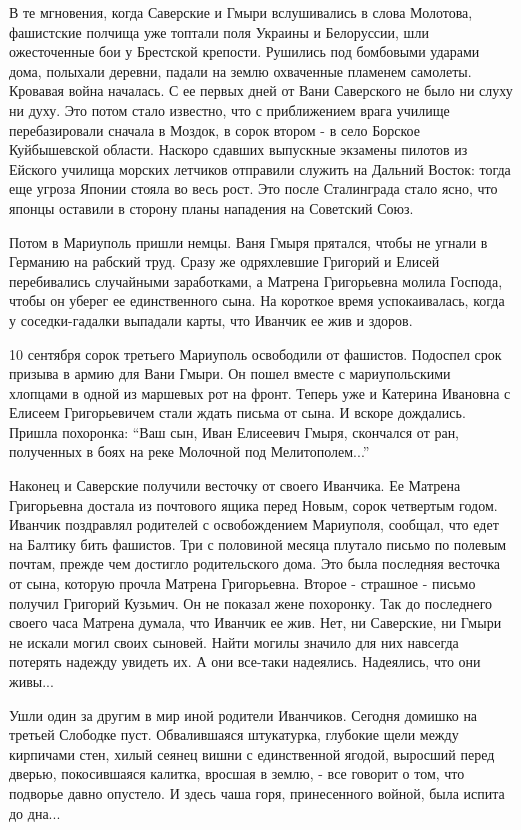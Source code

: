 В те мгновения, когда Саверские и Гмыри вслушивались в слова Молотова,
фашистские полчища уже топтали поля Украины и Белоруссии, шли ожесточенные бои
у Брестской крепости. Рушились под бомбовыми ударами дома, полыхали деревни,
падали на землю охваченные пламенем самолеты. Кровавая война началась. С ее
первых дней от Вани Саверского не было ни слуху ни духу. Это потом стало
известно, что с приближением врага училище перебазировали сначала в Моздок, в
сорок втором - в село Борское Куйбышевской области.  Наскоро сдавших выпускные
экзамены пилотов из Ейского училища морских летчиков отправили служить на
Дальний Восток: тогда еще угроза Японии стояла во весь рост. Это после
Сталинграда стало ясно, что японцы оставили в сторону планы нападения на
Советский Союз.

Потом в Мариуполь пришли немцы. Ваня Гмыря прятался, чтобы не угнали в
Германию на рабский труд. Сразу же одряхлевшие Григорий и Елисей перебивались
случайными заработка­ми, а Матрена Григорьевна молила Господа, чтобы он уберег
ее единственного сына. На короткое время успокаи­валась, когда у
соседки-гадалки выпадали карты, что Иванчик ее жив и здоров.

10 сентября сорок третьего Мариуполь освободили от фашистов. Подоспел срок
призыва в армию для Вани Гмыри. Он пошел вместе с мариупольскими хлопцами в
одной из маршевых рот на фронт. Теперь уже и Катерина Ивановна с Елисеем
Григорьевичем стали ждать письма от сына. И вскоре дождались. Пришла похоронка:
\enquote{Ваш сын, Иван Елисеевич Гмыря, скончался от ран, полученных в боях на реке
Молочной под Мелитополем...}

Наконец и Саверские получили весточку от своего Иванчика. Ее Матрена
Григорьевна достала из почтового ящика перед Новым, сорок четвертым годом.
Иванчик поздравлял родителей с освобождением Мари­уполя, сообщал, что едет на
Балтику бить фашистов. Три с половиной месяца плутало письмо по полевым почтам,
прежде чем достигло родительского дома. Это была последняя весточка от сына,
которую прочла Матрена Григорьевна. Второе - страшное - письмо получил
Григорий Кузьмич. Он не показал жене похоронку. Так до последнего своего часа
Матрена думала, что Иванчик ее жив. Нет, ни Саверские, ни Гмыри не искали могил
своих сыновей. Найти могилы значило для них навсегда потерять надежду увидеть
их. А они все-таки надеялись. Надеялись, что они живы...

Ушли один за другим в мир иной родители Иванчиков. Сегодня домишко на третьей
Слободке пуст. Обвалившая­ся штукатурка, глубокие щели между кирпичами стен,
хилый сеянец вишни с единственной ягодой, выросший перед дверью, покосившаяся
калитка, вросшая в зем­лю, - все говорит о том, что подворье давно опустело. И
здесь чаша горя, принесенного войной, была испита до дна...

